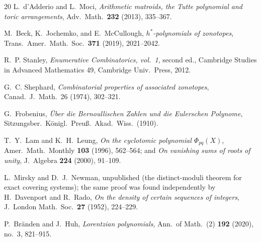 \documentclass[11pt,a4paper]{article}
\numberwithin{equation}{section}
\theoremstyle{plain}
\theoremstyle{definition}
\theoremstyle{remark}
\begin{document}
\begin{thebibliography}{20}
L.~d'Adderio and L.~Moci,
\emph{Arithmetic matroids, the Tutte polynomial and toric
arrangements},
Adv.\ Math.\ \textbf{232} (2013), 335--367.

M.~Beck, K.~Jochemko, and E.~McCullough,
\emph{$h^*$-polynomials of zonotopes},
Trans.\ Amer.\ Math.\ Soc.\ \textbf{371} (2019), 2021--2042.

R.~P. Stanley,
\emph{Enumerative Combinatorics, vol.~1}, second ed.,
Cambridge Studies in Advanced Mathematics 49, Cambridge Univ.\ Press,
2012.

G.~C. Shephard,
\emph{Combinatorial properties of associated zonotopes},
Canad.\ J.\ Math.\ 26 (1974), 302--321.

G.~Frobenius,
\emph{\"Uber die Bernoullischen Zahlen und die Eulerschen Polynome},
Sitzungsber.\ K\"onigl.\ Preu\ss.\ Akad.\ Wiss.\ (1910).

T.~Y.~Lam and K.~H.~Leung,
\emph{On the cyclotomic polynomial $\Phi_{pq}(X)$},
Amer.\ Math.\ Monthly \textbf{103} (1996), 562--564; and
\emph{On vanishing sums of roots of unity},
J.\ Algebra \textbf{224} (2000), 91--109.

L.~Mirsky and D.~J.~Newman,
unpublished (the distinct-moduli theorem for exact covering systems);
the same proof was found independently by
H.~Davenport and R.~Rado,
\emph{On the density of certain sequences of integers},
J.\ London Math.\ Soc.\ \textbf{27} (1952), 224--229.

P.~Br\"anden and J.~Huh,
\emph{Lorentzian polynomials},
Ann.\ of Math.\ (2) \textbf{192} (2020), no.~3, 821--915.

\end{thebibliography}
\endgroup
\end{document}

